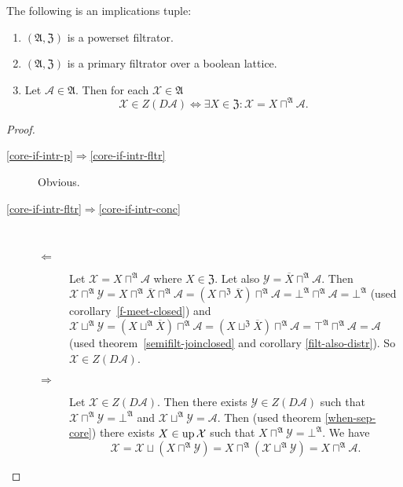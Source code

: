 \begin{thm}
\label{core-if-intr}The following is an implications tuple:
\begin{enumerate}
\item \label{core-if-intr-p}$(\mathfrak{A},\mathfrak{Z})$ is a powerset
filtrator.
\item \label{core-if-intr-fltr}$(\mathfrak{A},\mathfrak{Z})$ is a primary
filtrator over a boolean lattice.
\item \label{core-if-intr-conc}Let $\mathcal{A}\in\mathfrak{A}$. Then
for each $\mathcal{X}\in\mathfrak{A}$
\[
\mathcal{X}\in Z(D\mathcal{A})\Leftrightarrow\exists X\in\mathfrak{Z}:\mathcal{X}=X\sqcap^{\mathfrak{A}}\mathcal{A}.
\]

\end{enumerate}
\end{thm}
\begin{proof}
~
\begin{description}
\item [{\ref{core-if-intr-p}$\Rightarrow$\ref{core-if-intr-fltr}}] Obvious.
\item [{\ref{core-if-intr-fltr}$\Rightarrow$\ref{core-if-intr-conc}}] ~

\begin{description}
\item [{$\Leftarrow$}] Let $\mathcal{X}=X\sqcap^{\mathfrak{A}}\mathcal{A}$
where $X\in\mathfrak{Z}$. Let also $\mathcal{Y}=\overline{X}\sqcap^{\mathfrak{A}}\mathcal{A}$.
Then $\mathcal{X}\sqcap^{\mathfrak{A}}\mathcal{Y}=X\sqcap^{\mathfrak{A}}\overline{X}\sqcap^{\mathfrak{A}}\mathcal{A}=(X\sqcap^{\mathfrak{Z}}\overline{X})\sqcap^{\mathfrak{A}}\mathcal{A}=\bot^{\mathfrak{A}}\sqcap^{\mathfrak{A}}\mathcal{A}=\bot^{\mathfrak{A}}$
(used corollary~\ref{f-meet-closed}) and $\mathcal{X}\sqcup^{\mathfrak{A}}\mathcal{Y}=(X\sqcup^{\mathfrak{A}}\overline{X})\sqcap^{\mathfrak{A}}\mathcal{A}=(X\sqcup^{\mathfrak{Z}}\overline{X})\sqcap^{\mathfrak{A}}\mathcal{A}=\top^{\mathfrak{A}}\sqcap^{\mathfrak{A}}\mathcal{A}=\mathcal{A}$
(used theorem~\ref{semifilt-joinclosed} and corollary \ref{filt-also-distr}).
So $\mathcal{X}\in Z(D\mathcal{A})$.
\item [{$\Rightarrow$}] Let $\mathcal{X}\in Z(D\mathcal{A})$. Then there
exists $\mathcal{Y}\in Z(D\mathcal{A})$ such that $\mathcal{X}\sqcap^{\mathfrak{A}}\mathcal{Y}=\bot^{\mathfrak{A}}$
and $\mathcal{X}\sqcup^{\mathfrak{A}}\mathcal{Y}=\mathcal{A}$. Then
(used theorem \ref{when-sep-core}) there exists $X\in\operatorname{up}\mathcal{X}$
such that $X\sqcap^{\mathfrak{A}}\mathcal{Y}=\bot^{\mathfrak{A}}$.
We have
\[
\mathcal{X}=\mathcal{X}\sqcup(X\sqcap^{\mathfrak{A}}\mathcal{Y})=X\sqcap^{\mathfrak{A}}(\mathcal{X}\sqcup^{\mathfrak{A}}\mathcal{Y})=X\sqcap^{\mathfrak{A}}\mathcal{A}.
\]

\end{description}
\end{description}
\end{proof}

